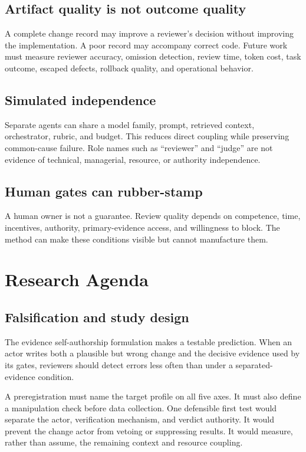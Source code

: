 \documentclass[11pt]{article}
\begin{document}
\subsection{Artifact quality is not outcome quality}

A complete change record may improve a reviewer's decision without improving the implementation. A poor record may accompany correct code. Future work must measure reviewer accuracy, omission detection, review time, token cost, task outcome, escaped defects, rollback quality, and operational behavior.

\subsection{Simulated independence}

Separate agents can share a model family, prompt, retrieved context, orchestrator, rubric, and budget. This reduces direct coupling while preserving common-cause failure. Role names such as ``reviewer'' and ``judge'' are not evidence of technical, managerial, resource, or authority independence.

\subsection{Human gates can rubber-stamp}

A human owner is not a guarantee. Review quality depends on competence, time, incentives, authority, primary-evidence access, and willingness to block. The method can make these conditions visible but cannot manufacture them.

\section{Research Agenda}
\label{sec:research}

\subsection{Falsification and study design}

The evidence self-authorship formulation makes a testable prediction. When an actor writes both a plausible but wrong change and the decisive evidence used by its gates, reviewers should detect errors less often than under a separated-evidence condition.

A preregistration must name the target profile on all five axes. It must also define a manipulation check before data collection. One defensible first test would separate the actor, verification mechanism, and verdict authority. It would prevent the change actor from vetoing or suppressing results. It would measure, rather than assume, the remaining context and resource coupling.
\end{document}
